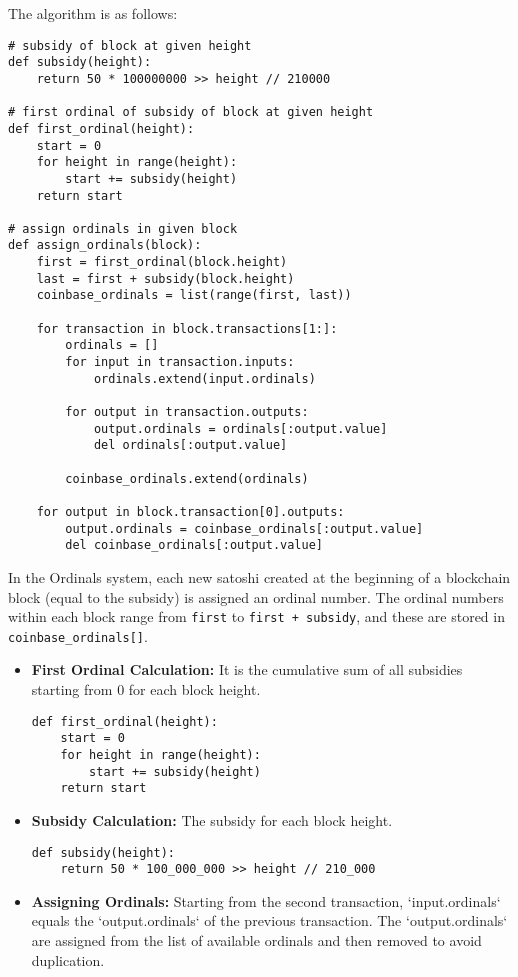 The algorithm is as follows:
\begin{lstlisting}
# subsidy of block at given height
def subsidy(height):
    return 50 * 100000000 >> height // 210000
    
# first ordinal of subsidy of block at given height
def first_ordinal(height):
    start = 0
    for height in range(height):
        start += subsidy(height)
    return start
    
# assign ordinals in given block
def assign_ordinals(block):
    first = first_ordinal(block.height)
    last = first + subsidy(block.height)
    coinbase_ordinals = list(range(first, last))
    
    for transaction in block.transactions[1:]:
        ordinals = []
        for input in transaction.inputs:
            ordinals.extend(input.ordinals)
    
        for output in transaction.outputs:
            output.ordinals = ordinals[:output.value]
            del ordinals[:output.value]
    
        coinbase_ordinals.extend(ordinals)
    
    for output in block.transaction[0].outputs:
        output.ordinals = coinbase_ordinals[:output.value]
        del coinbase_ordinals[:output.value]
\end{lstlisting}
In the Ordinals system, 
each new satoshi created at the beginning of a blockchain block 
(equal to the subsidy) is assigned an ordinal number. 
The ordinal numbers within each block range from 
\texttt{first} to \texttt{first + subsidy}, 
and these are stored in \texttt{coinbase\_ordinals[]}.

\begin{itemize}
    \item \textbf{First Ordinal Calculation:} It is the cumulative sum of all subsidies starting from 0 for each block height.
\begin{lstlisting}
def first_ordinal(height):
    start = 0
    for height in range(height):
        start += subsidy(height)
    return start
\end{lstlisting}
    
    \item \textbf{Subsidy Calculation:} The subsidy for each block height.
\begin{lstlisting}
def subsidy(height):
    return 50 * 100_000_000 >> height // 210_000
\end{lstlisting}
    
    \item \textbf{Assigning Ordinals:} 
    Starting from the second transaction, 
    `input.ordinals` equals the `output.ordinals` of the previous transaction. 
    The `output.ordinals` are assigned from the list of available ordinals and then removed to avoid duplication.
\end{itemize}

